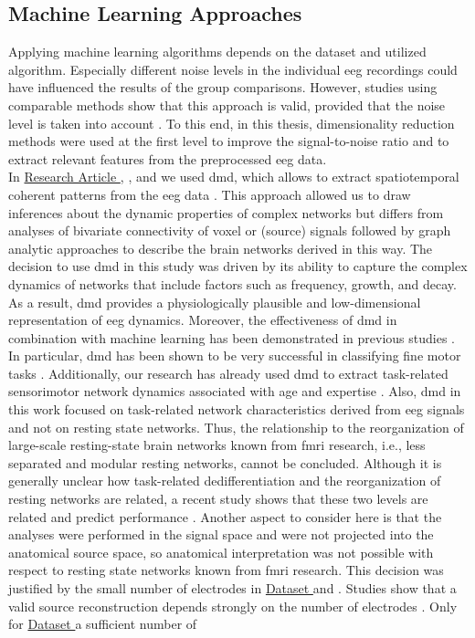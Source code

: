 \subsection{Machine Learning Approaches}
Applying machine learning algorithms depends on the dataset and utilized algorithm. Especially different noise levels in the individual \gls{eeg} recordings could have influenced the results of the group comparisons. However, studies using comparable methods show that this approach is valid, provided that the noise level is taken into account \cite{Bae2020, Vahid2020}. To this end, in this thesis, dimensionality reduction methods were used at the first level to improve the signal-to-noise ratio and to extract relevant features from the preprocessed \gls{eeg} data. \\
In \hyperref[results:paperI]{Research Article }, \hyperref[results:paperIII]{}, and \hyperref[results:paperIV]{} we used \gls{dmd}, which allows to extract spatiotemporal coherent patterns from the \gls{eeg} data \cite{Brunton2016}. This approach allowed us to draw inferences about the dynamic properties of complex networks but differs from analyses of bivariate connectivity of voxel or (source) signals followed by graph analytic approaches to describe the brain networks derived in this way. The decision to use \gls{dmd} in this study was driven by its ability to capture the complex dynamics of networks that include factors such as frequency, growth, and decay. As a result, \gls{dmd} provides a physiologically plausible and low-dimensional representation of \gls{eeg} dynamics. Moreover, the effectiveness of \gls{dmd} in combination with machine learning has been demonstrated in previous studies \cite{Brunton2016, Kunert-Graf2019, Shiraishi2020}. In particular, \gls{dmd} has been shown to be very successful in classifying fine motor tasks \cite{Shiraishi2020}. Additionally, our research has already used \gls{dmd} to extract task-related sensorimotor network dynamics associated with age and expertise \cite{Vieluf2018, Goelz2018}. Also, \gls{dmd} in this work focused on task-related network characteristics derived from \gls{eeg} signals and not on resting state networks. Thus, the relationship to the reorganization of large-scale resting-state brain networks known from \gls{fmri} research, i.e., less separated and modular resting networks, cannot be concluded. Although it is generally unclear how task-related dedifferentiation and the reorganization of resting networks are related, a recent study shows that these two levels are related and predict performance \cite{Cassedy2020netw_distinct}. Another aspect to consider here is that the analyses were performed in the signal space and were not projected into the anatomical source space, so anatomical interpretation was not possible with respect to resting state networks known from \gls{fmri} research. This decision was justified by the small number of electrodes in \hyperref[methods:datasets:I]{Dataset } and \hyperref[methods:datasets:II]{}. Studies show that a valid source reconstruction depends strongly on the number of electrodes \cite{Song2015, Lantz2003}. Only for \hyperref[methods:datasets:III]{Dataset } a sufficient number of 